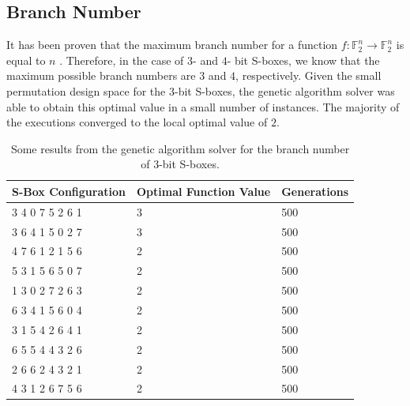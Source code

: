 \documentclass[11pt]{article}
\newcommand{\field}[1]{\mathbb{#1}} %
\begin{document}
\subsection{Branch Number}


It has been proven that the maximum branch number for a function $f : \field{F}_2^n \to \field{F}_2^n$ is equal to $n$ \cite{MaxBN}. Therefore, in the case of $3$- and $4$- bit S-boxes, we know that the maximum possible branch numbers are $3$ and $4$, respectively. Given the small permutation design space for the $3$-bit S-boxes, the genetic algorithm solver was able to obtain this optimal value in a small number of instances. The majority of the executions converged to the local optimal value of $2$.

\begin{table}
	\centering
	\label{bnTable}
	\caption{Some results from the genetic algorithm solver for the branch number of $3$-bit S-boxes.}
    \begin{tabular}{|l|l|l|}
        \hline
        S-Box Configuration & Optimal Function Value & Generations \\ \hline
        3     4     0     7     5     2     6     1 & 3 & 500 \\ 
	3     6     4     1     5     0     2     7 & 3 & 500 \\ 
        4     7     6     1     2     1     5     6 & 2 & 500 \\ 
        5     3     1     5     6     5     0     7 & 2 & 500 \\ 
        1     3     0     2     7     2     6     3 & 2 & 500 \\ 
        6     3     4     1     5     6     0     4 & 2 & 500 \\ 
        3     1     5     4     2     6     4     1 & 2 & 500 \\ 
        6     5     5     4     4     3     2     6 & 2 & 500 \\ 
        2     6     6     2     4     3     2     1 & 2 & 500 \\ 
        4     3     1     2     6     7     5     6 & 2 & 500 \\
        \hline
    \end{tabular}
\end{table}
\end{document}
